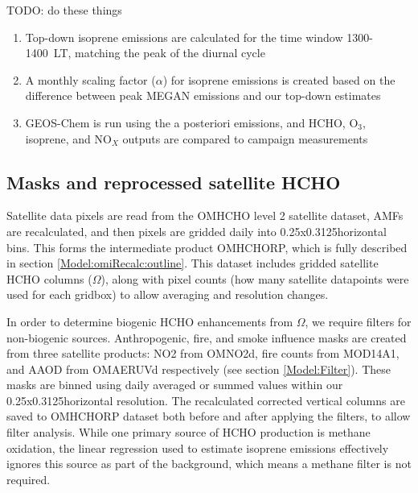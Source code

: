 \begin{enumerate}
        TODO: do these things
      \begin{enumerate}
        \item 
          Top-down isoprene emissions are calculated for the time window 1300-1400~LT, matching the peak of the diurnal cycle
        \item 
          A monthly scaling factor ($\alpha$) for isoprene emissions is created based on the difference between peak MEGAN emissions and our top-down estimates
        \item GEOS-Chem is run using the a posteriori emissions, and HCHO, O$_3$, isoprene, and NO$_X$ outputs are compared to campaign measurements
      \end{enumerate}
    \end{enumerate}
    
  
  \subsection{Masks and reprocessed satellite HCHO}
    
    Satellite data pixels are read from the OMHCHO level 2 satellite dataset, AMFs are recalculated, and then pixels are gridded daily into 0.25x0.3125\degr horizontal bins. 
    This forms the intermediate product OMHCHORP, which is fully described in section \ref{Model:omiRecalc:outline}.
    This dataset includes gridded satellite HCHO columns ($\Omega$), along with pixel counts (how many satellite datapoints were used for each gridbox) to allow averaging and resolution changes.
    
    In order to determine biogenic HCHO enhancements from $\Omega$, we require filters for non-biogenic sources.
    Anthropogenic, fire, and smoke influence masks are created from three satellite products: NO2 from OMNO2d, fire counts from MOD14A1, and AAOD from OMAERUVd respectively (see section \ref{Model:Filter}).
    These masks are binned using daily averaged or summed values within our 0.25x0.3125\degr horizontal resolution.
    The recalculated corrected vertical columns are saved to OMHCHORP dataset both before and after applying the filters, to allow filter analysis.
    While one primary source of HCHO production is methane oxidation, the linear regression used to estimate isoprene emissions effectively ignores this source as part of the background, which means a methane filter is not required.
    
